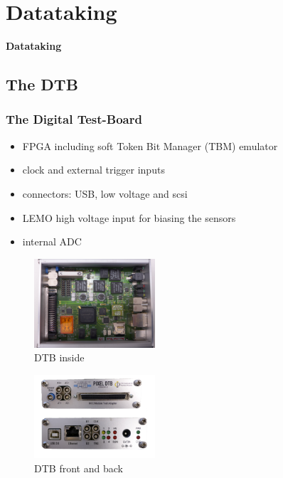 \documentclass[9pt]{beamer}
\begin{document}
\section{Datataking}
\begin{frame}
	\begin{alertblock}{
		\begin{center}
			\Large{\textbf{Datataking}}
		\end{center}}
	\end{alertblock}
\end{frame}
\subsection{The DTB}
\begin{frame}
	\frametitle{The Digital Test-Board}
	\begin{itemize}
		\item FPGA including soft Token Bit Manager (TBM) emulator
		\item clock and external trigger inputs
		\item connectors: USB, low voltage and scsi 
		\item LEMO high voltage input for biasing the sensors
		\item internal ADC
	\end{itemize}
	\begin{center}
		\begin{minipage}{5cm}
			\centering
			\begin{figure}
				\caption{DTB inside}
				\includegraphics[width=4.5cm]{Pics/dtb_inside}
			\end{figure}
		\end{minipage}
		\hspace*{2pt}
		\begin{minipage}{5cm}
			\centering
			\begin{figure}
				\caption{DTB front and back}
				\includegraphics[width=4.5cm]{Pics/DTB-Sides}
			\end{figure}
		\end{minipage}\no\s
	\end{center}
\end{frame}
\end{document}
